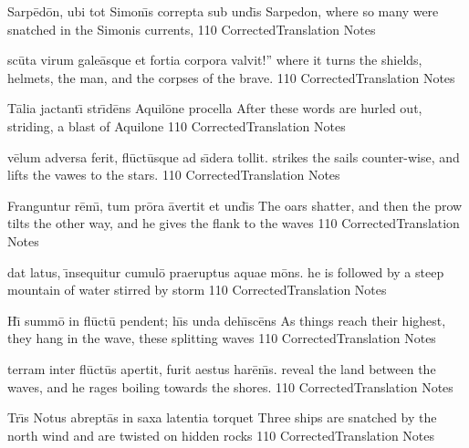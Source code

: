 \documentclass[]{book}
\begin{document}
	\latline
	  {Sarp\={\macron e}d\={\macron o}n, ubi tot Simon\={\macron \i}s correpta sub und\={\macron \i}s}
	  { Sarpedon, where so many were snatched in the Simonis currents,  }
	  {110}
	  { CorrectedTranslation }
	  { Notes }


	\newpage

	\latline
	  {sc\={\macron u}ta virum gale\={\macron a}sque et fortia corpora valvit!''}
	  { where it turns the shields, helmets, the man, and the corpses of the brave. }
	  {110}
	  { CorrectedTranslation }
	  { Notes }


	\latline
	  {T\={\macron a}lia jactant\={\macron \i} str\={\macron \i}d\={\macron e}ns Aquil\={\macron o}ne procella}
	  { After these words are hurled out, striding, a blast of Aquilone }
	  {110}
	  { CorrectedTranslation }
	  { Notes }


	\latline
	  {v\={\macron e}lum adversa ferit, fl\={\macron u}ct\={\macron u}sque ad s\={\macron \i}dera tollit.}
	  { strikes the sails counter-wise, and lifts the vawes to the stars. }
	  {110}
	  { CorrectedTranslation }
	  { Notes }


	\newpage

	\latline
	  {Franguntur r\={\macron e}m\={\macron \i}, tum pr\={\macron o}ra \={\macron a}vertit et und\={\macron \i}s}
	  { The oars shatter, and then the prow tilts the other way, and he gives the flank to the waves }
	  {110}
	  { CorrectedTranslation }
	  { Notes }


	\latline
	  {dat latus, \={\macron \i}nsequitur cumul\={\macron o} praeruptus aquae m\={\macron o}ns.}
	  { he is followed by a steep mountain of water stirred by storm }
	  {110}
	  { CorrectedTranslation }
	  { Notes }


	\latline
	  {H\={\macron \i} summ\={\macron o} in fl\={\macron u}ct\={\macron u} pendent; h\={\macron \i}s unda deh\={\macron \i}sc\={\macron e}ns}
	  { As things reach their highest, they hang in the wave, these splitting waves }
	  {110}
	  { CorrectedTranslation }
	  { Notes }


	\newpage

	\latline
	  {terram inter fl\={\macron u}ct\={\macron u}s apertit, furit aestus har\={\macron e}n\={\macron \i}s.}
	  { reveal the land between the waves, and he rages boiling towards the shores. }
	  {110}
	  { CorrectedTranslation }
	  { Notes }


	\latline
	  {Tr\={\macron \i}s Notus abrept\={\macron a}s in saxa latentia torquet}
	  { Three ships are snatched by the north wind and are twisted on hidden rocks }
	  {110}
	  { CorrectedTranslation }
	  { Notes }
\end{document}
